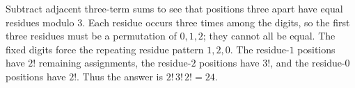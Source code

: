Subtract adjacent three-term sums to see that positions three apart have equal residues modulo $3$. Each residue occurs three times among the digits, so the first three residues must be a permutation of $0,1,2$; they cannot all be equal. The fixed digits force the repeating residue pattern $1,2,0$. The residue-$1$ positions have $2!$ remaining assignments, the residue-$2$ positions have $3!$, and the residue-$0$ positions have $2!$. Thus the answer is $\boxed{2!\,3!\,2!=24}$.
